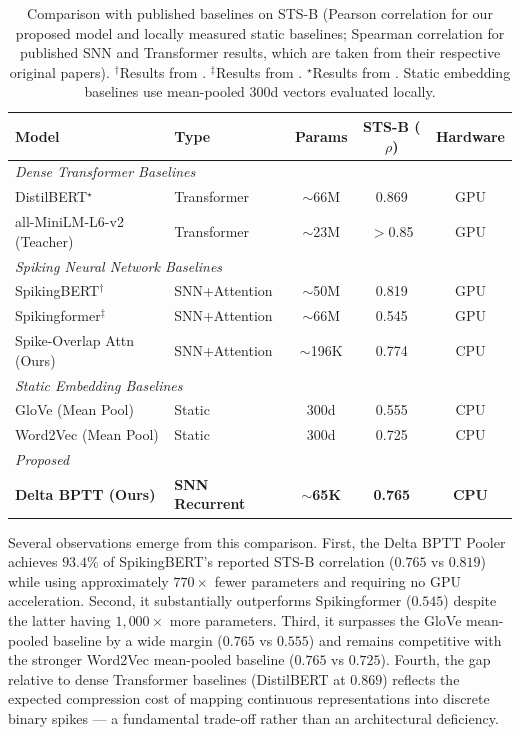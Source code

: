 \documentclass[11pt, conference, compsoc, twoside]{IEEEtran}
\begin{document}
\begin{table}[t]
\begin{center}
{\caption{Comparison with published baselines on STS-B (Pearson correlation for our proposed model and locally measured static baselines; Spearman correlation for published SNN and Transformer results, which are taken from their respective original papers). $^\dagger$Results from \cite{bal2024spikingbert}. $^\ddagger$Results from \cite{zhou2025spikingformer}. $^\star$Results from \cite{sanh2019distilbert}. Static embedding baselines use mean-pooled 300d vectors evaluated locally.}\label{tab:external_baselines}}


\begin{tabular}{llccc}
\toprule
\textbf{Model} & \textbf{Type} & \textbf{Params} & \textbf{STS-B ($\rho$)} & \textbf{Hardware} \\
\midrule
\multicolumn{5}{l}{\textit{Dense Transformer Baselines}} \\
DistilBERT$^\star$ & Transformer & $\sim$66M & 0.869 & GPU \\
all-MiniLM-L6-v2 (Teacher) & Transformer & $\sim$23M & $>$0.85 & GPU \\
\midrule
\multicolumn{5}{l}{\textit{Spiking Neural Network Baselines}} \\
SpikingBERT$^\dagger$ & SNN+Attention & $\sim$50M & 0.819 & GPU \\
Spikingformer$^\ddagger$ & SNN+Attention & $\sim$66M & 0.545 & GPU \\
Spike-Overlap Attn (Ours) & SNN+Attention & $\sim$196K & 0.774 & CPU \\
\midrule
\multicolumn{5}{l}{\textit{Static Embedding Baselines}} \\
GloVe (Mean Pool) & Static & 300d & 0.555 & CPU \\
Word2Vec (Mean Pool) & Static & 300d & 0.725 & CPU \\
\midrule
\multicolumn{5}{l}{\textit{Proposed}} \\
\textbf{Delta BPTT (Ours)} & \textbf{SNN Recurrent} & \textbf{$\sim$65K} & \textbf{0.765} & \textbf{CPU} \\
\bottomrule
\end{tabular}
\end{center}
\end{table}

Several observations emerge from this comparison. First, the Delta BPTT Pooler achieves $93.4\%$ of SpikingBERT's reported STS-B correlation ($0.765$ vs $0.819$) while using approximately $770\times$ fewer parameters and requiring no GPU acceleration. Second, it substantially outperforms Spikingformer ($0.545$) despite the latter having $1{,}000\times$ more parameters. Third, it surpasses the GloVe mean-pooled baseline by a wide margin ($0.765$ vs $0.555$) and remains competitive with the stronger Word2Vec mean-pooled baseline ($0.765$ vs $0.725$). Fourth, the gap relative to dense Transformer baselines (DistilBERT at $0.869$) reflects the expected compression cost of mapping continuous representations into discrete binary spikes --- a fundamental trade-off rather than an architectural deficiency.
\end{document}

